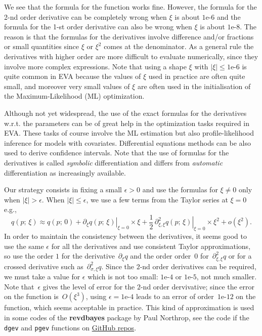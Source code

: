 \documentclass[11pt]{article}\usepackage[]{graphicx}\usepackage[]{xcolor}
\newcommand{\code}[1]{\texttt{#1}}
\begin{document}
\noindent
We see that the formula for the function works fine. However, the
formula for the 2-nd order derivative can be completely wrong when
$\xi$ is about $\text{1e-6}$ and the formula for the 1-st order
derivative can also be wrong when $\xi$ is about $\text{1e-8}$. The
reason is that the formulas for the derivatives involve difference
and/or fractions or small quantities since $\xi$ or $\xi^2$ comes at
the denominator. As a general rule the derivatives with higher order
are more difficult to evaluate numerically, since they involve more
complex expressions.  Note that using a shape $\xi$ with
$|\xi| \leqslant \text{1e-6}$ is quite common in EVA because the
values of $\xi$ used in practice are often quite small, and moreover 
very small values of $\xi$ are often used in the initialisation of the
Maximum-Likelihood (ML) optimization.

Although not yet widespread, the use of the exact formulas for the
derivatives w.r.t. the parameters can be of great help in the
optimization tasks required in EVA. These tasks of course involve the
ML estimation but also profile-likelihood inference for models with
covariates. Differential equations methods can be also used to derive
confidence intervals. Note that the use of formulas for the
derivatives is called \textit{symbolic} differentiation and  differs
from \textit{automatic} differentiation as increasingly available.

Our strategy consists in fixing a small $\epsilon >0$ and use the
formulas for $\xi \neq 0$ only when $|\xi| > \epsilon$. When
$|\xi| \leqslant \epsilon$, we use a few terms from the Taylor series
at $\xi =0$ e.g.,
$$
q(p;\,\xi) \approx q(p;\, 0) +
\left. \partial_{\xi} q(p;\, \xi)\right|_{\xi = 0} \times \xi
+ \frac{1}{2} \,
\left.\partial^2_{\xi,\xi} q(p;\, \xi)\right|_{\xi = 0}
\times \xi^2 + o(\xi^2).
$$
In order to maintain the consistency between the derivatives, it seems
good to use the same $\epsilon$ for all the derivatives and use
consistent Taylor approximations, so use the order $1$ for the
derivative~$\partial_{\xi} q$ and the order order~$0$
for~$\partial^2_{\xi,\xi} q$ or for a crossed derivative such
as~$\partial^2_{\sigma,\xi} q$. Since the $2$-nd order derivatives can
be required, we must take a value for $\epsilon$ which is not too
small: $\text{1e-4}$ or $\text{1e-5}$, not much smaller. Note
that~$\epsilon$ gives the level of error for the $2$-nd order
dervivative; since the error on the function is~$O(\xi^3)$, using
$\epsilon = \text{1e-4}$ leads to an error of order~$\text{1e-12}$ on
the function, which seems acceptable in practice. This kind of
approximation is used in some codes of the \textbf{revdbayes} package
by Paul Northrop, see the code if the \code{dgev} and \code{pgev}
functions on
\href{https://github.com/paulnorthrop/revdbayes/blob/master/R/distributions.R}{GitHub
  repos}.
\end{document}
